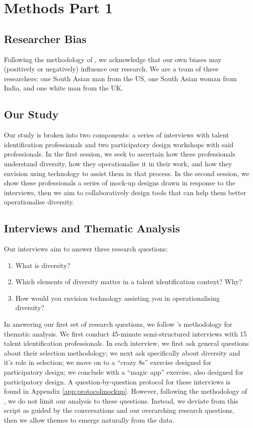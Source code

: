 \section{Methods Part 1}
\subsection{Researcher Bias}
Following the methodology of \textcite{braun_using_2006}, we acknowledge that our own biases may (positively or negatively) influence our research. We are a team of three researchers: one South Asian man from the US, one South Asian woman from India, and one white man from the UK.

\subsection{Our Study}
Our study is broken into two components: a series of interviews with talent identification professionals and two participatory design workshops with said professionals. In the first session, we seek to ascertain how these professionals understand diversity, how they operationalise it in their work, and how they envision using technology to assist them in that process. In the second session, we show these professionals a series of mock-up designs drawn in response to the interviews, then we aim to collaboratively design tools that can help them better operationalise diversity.

\subsection{Interviews and Thematic Analysis}
Our interviews aim to answer three research questions:

\begin{enumerate}
    \item What is diversity?
    \item Which elements of diversity matter in a talent identification context? Why?
    \item How would you envision technology assisting you in operationalising diversity?
\end{enumerate}

In answering our first set of research questions, we follow \cite{braun_using_2006}'s methodology for thematic analysis. We first conduct 45-minute semi-structured interviews with 15 talent identification professionals. In each interview, we first ask general questions about their selection methodology; we next ask specifically about diversity and it's role in selection; we move on to a ``crazy 8s'' exercise designed for participatory design; we conclude with a ``magic app'' exercise, also designed for participatory design. A question-by-question protocol for these interviews is found in Appendix \ref{app:protocolmockup}. However, following the methodology of \cite{braun_using_2006}, we do not limit our analysis to these questions. Instead, we deviate from this script as guided by the conversations and our overarching research questions, then we allow themes to emerge naturally from the data.

